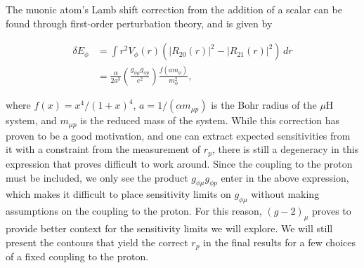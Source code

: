The muonic atom's Lamb shift correction from the addition of a scalar can be found through first-order perturbation theory, and is given by \cite{TuckerSmith:2010ra, Carlson:2015jba}

\begin{align}
    \delta E_\phi &= \int r^2 V_\phi(r)\left(\left|R_{20}(r)\right|^2 - \left|R_{21}(r)\right|^2\right)\,dr \\
                  &= \frac{\alpha}{2 a^3} \left(\frac{g_{\phi\mu} g_{\phi p}}{e^2}\right) \frac{f(a m_\phi)}{m_\phi^2} \textrm{,}
\end{align}

\noindent where $f(x) = x^4/(1+x)^4$, $a = 1/(\alpha m_{\mu p})$ is the Bohr radius of the $\mu\textrm{H}$ system, and $m_{\mu p}$ is the reduced mass of the system.
While this correction has proven to be a good motivation, and one can extract expected sensitivities from it with a constraint from the measurement of $r_p$, there is still a degeneracy in this expression that proves difficult to work around.
Since the coupling to the proton must be included, we only see the product $g_{\phi\mu} g_{\phi p}$ enter in the above expression, which makes it difficult to place sensitivity limits on $g_{\phi\mu}$ without making assumptions on the coupling to the proton.
For this reason, $(g-2)_\mu$ proves to provide better context for the sensitivity limits we will explore.
We will still present the contours that yield the correct $r_p$ in the final results for a few choices of a fixed coupling to the proton.

